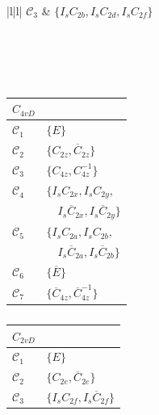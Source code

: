 \begin{table}
\begin{subtable}[t]{0.32\linewidth}
\begin{tabular}[t]{|l|l|}
                $\mathcal{C}_{3}$ & $\{I_{s} C_{2 b}, I_{s} C_{2 d}, I_{s} C_{2 f}\}$\\
                \hline
                \\
            \end{tabular}
            \caption{}
            \label{table:C3v}
        \end{subtable}\\\\
        \begin{subtable}[t]{0.32\linewidth}
            \centering
            \begin{tabular}[t]{|l|l|}
                \hline
                $C_{4vD}$ & \\
                \hline
                $\mathcal{C}_{1}$ & $\{E\}$ \\
                $\mathcal{C}_{2}$ & $\{C_{2 z}, \overline{C}_{2 z}\}$ \\
                $\mathcal{C}_{3}$ & $\{C_{4 z}, C_{4 z}^{-1}\}$ \\
                $\mathcal{C}_{4}$ & $\{I_{s} C_{2 x}, I_{s} C_{2 y},$\\
                & $\quad I_{s} \overline{C}_{2 x}, I_{s} \overline{C}_{2 y}\}$ \\
                $\mathcal{C}_{5}$ & $\{I_{s} C_{2 a}, I_{s} C_{2 b},$\\
                & $\quad I_{s} \overline{C}_{2 a}, I_{s} \overline{C}_{2 b}\}$ \\
                $\mathcal{C}_{6}$ & $\{\overline{E}\}$ \\
                $\mathcal{C}_{7}$ & $\{\overline{C}_{4 z}, \overline{C}_{4 z}^{-1}\}$\\
                \hline
            \end{tabular}
            \caption{}
            \label{table:C4vD}
        \end{subtable}
        \begin{subtable}[t]{0.32\linewidth}
            \centering
            \begin{tabular}[t]{|l|l|}
                \hline
                $C_{2vD}$ & \\
                \hline
                $\mathcal{C}_{1}$ & $\{E\}$ \\
                $\mathcal{C}_{2}$ & $\{C_{2 e}, \overline{C}_{2 e}\}$ \\
                $\mathcal{C}_{3}$ & $\{I_{s} C_{2 f}, I_{s} \overline{C}_{2 f}\}$ \\

\end{tabular}
\end{subtable}
\end{table}
